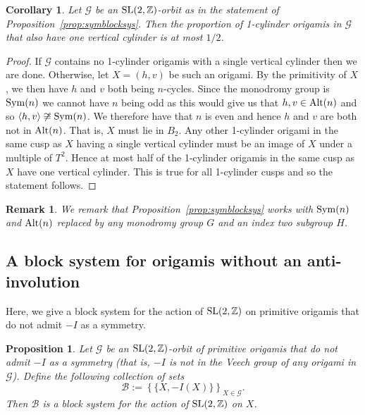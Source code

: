 \documentclass[a4paper,11pt]{amsart}
\numberwithin{equation}{section}
\numberwithin{figure}{section}
\numberwithin{table}{section}
\newtheorem{corollary}[theorem]{Corollary}
\newtheorem{proposition}[theorem]{Proposition}
\newtheorem{remark}[theorem]{Remark}
\newcommand{\Z}{\mathbb{Z}}
\newcommand{\orb}{\mathcal{G}}
\DeclareMathOperator{\SL}{{\rm{SL}}}
\DeclareMathOperator{\Sym}{{\rm{Sym}}}
\DeclareMathOperator{\Alt}{{\rm{Alt}}}
\begin{document}
\begin{corollary}
Let $\orb$ be an $\SL(2,\Z)$-orbit as in the statement of Proposition~\ref{prop:symblocksys}. Then the proportion of 1-cylinder origamis in $\orb$ that also have one vertical cylinder is at most $1/2$.
\end{corollary}

\begin{proof}
If $\orb$ contains no 1-cylinder origamis with a single vertical cylinder then we are done. Otherwise, let $X = (h,v)$ be such an origami. By the primitivity of $X$, we then have $h$ and $v$ both being $n$-cycles. Since the monodromy group is $\Sym(n)$ we cannot have $n$ being odd as this would give us that $h,v\in \Alt(n)$ and so $\langle h,v\rangle \not \cong \Sym(n)$. We therefore have that $n$ is even and hence $h$ and $v$ are both not in $\Alt(n)$. That is, $X $ must lie in $B_{2}$. Any other 1-cylinder origami in the same cusp as $X$ having a single vertical cylinder must be an image of $X$ under a multiple of $T^{2}$. Hence at most half of the 1-cylinder origamis in the same cusp as $X$ have one vertical cylinder. This is true for all 1-cylinder cusps and so the statement follows.
\end{proof}

\begin{remark}
    We remark that Proposition~\ref{prop:symblocksys} works with $\Sym(n)$ and $\Alt(n)$ replaced by any monodromy group $G$ and an index two subgroup $H$.
\end{remark}


\subsection{A block system for origamis without an anti-involution}

Here, we give a block system for the action of $\SL(2,\Z)$ on primitive origamis that do not admit $-I$ as a symmetry.

\begin{proposition}\label{prop:nonprymnonhyp}
Let $\orb$ be an $\SL(2,\Z)$-orbit of primitive origamis that do not admit $-I$ as a symmetry (that is, $-I$ is not in the Veech group of any origami in $\orb$). Define the following collection of sets
\[\mathscr{B}:= \left\{\{X,-I(X)\}\right\}_{X\in \orb}.\]
Then $\mathscr{B}$ is a block system for the action of $\SL(2,\Z)$ on $X$.
\end{proposition}
\end{document}

